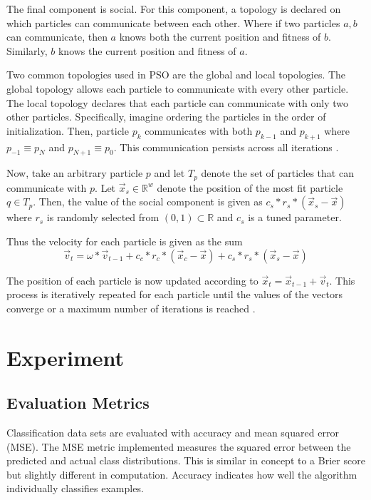 \documentclass[twoside,11pt]{article}
\newcommand{\Rw}{\mathbb{R}^w }
\begin{document}
	The final component is social.
	For this component, a topology is declared on which particles can communicate between each other.
	Where if two particles $a,b$ can communicate, then $a$ knows both the current position and fitness of $b$.
	Similarly, $b$ knows the current position and fitness of $a$.

	Two common topologies used in PSO are the global and local topologies.
	The global topology allows each particle to communicate with every other particle.
	The local topology declares that each particle can communicate with only two other particles.
	Specifically, imagine ordering the particles in the order of initialization.
	Then, particle $p_k$ communicates with both $p_{k-1}$ and $p_{k+1}$ where $p_{-1} \equiv p_N$ and $p_{N+1} \equiv p_{0}$.
	This communication persists across all iterations \citep{og-pso}.

	Now, take an arbitrary particle $p$ and let $T_p$ denote the set of particles that can communicate with $p$.
	Let $\vec{x}_s \in \Rw$ denote the position of the most fit particle $q \in T_p$. Then, the value of the social component is given as $c_s * r_s * (\vec{x}_s - \vec{x})$ where $r_s$ is randomly selected from $(0,1) \subset \mathbb{R}$ and $c_s$ is a tuned parameter.

	Thus the velocity for each particle is given as the sum
	$$\vec{v}_t = \omega * \vec{v}_{t-1} + c_c*r_c*(\vec{x}_c - \vec{x}) + c_s*r_s*(\vec{x}_s - \vec{x})$$

	The position of each particle is now updated according to $\vec{x}_t = \vec{x}_{t-1} + \vec{v}_t$. This process is iteratively repeated for each particle until the values of the vectors converge or a maximum number of iterations is reached \citep{og-pso}.

\section{Experiment}

\subsection{Evaluation Metrics}

	Classification data sets are evaluated with accuracy and mean squared error (MSE).
	The MSE metric implemented measures the squared error between the predicted and actual class distributions.
	This is similar in concept to a Brier score but slightly different in computation. Accuracy indicates how well the algorithm individually classifies examples.
\end{document}
